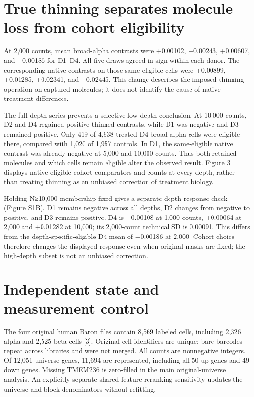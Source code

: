 \documentclass[11pt,letterpaper]{article}
\begin{document}
\section*{True thinning separates molecule loss from cohort eligibility}
At 2,000 counts, mean broad-alpha contrasts were +0.00102, −0.00243, +0.00607, and −0.00186 for D1–D4. All five draws agreed in sign within each donor. The corresponding native contrasts on those same eligible cells were +0.00899, +0.01285, +0.02341, and +0.02445. This change describes the imposed thinning operation on captured molecules; it does not identify the cause of native treatment differences.

The full depth series prevents a selective low-depth conclusion. At 10,000 counts, D2 and D4 regained positive thinned contrasts, while D1 was negative and D3 remained positive. Only 419 of 4,938 treated D4 broad-alpha cells were eligible there, compared with 1,020 of 1,957 controls. In D1, the same-eligible native contrast was already negative at 5,000 and 10,000 counts. Thus both retained molecules and which cells remain eligible alter the observed result. Figure 3 displays native eligible-cohort comparators and counts at every depth, rather than treating thinning as an unbiased correction of treatment biology.

Holding N≥10,000 membership fixed gives a separate depth-response check (Figure S1B). D1 remains negative across all depths, D2 changes from negative to positive, and D3 remains positive. D4 is −0.00108 at 1,000 counts, +0.00064 at 2,000 and +0.01282 at 10,000; its 2,000-count technical SD is 0.00091. This differs from the depth-specific-eligible D4 mean of −0.00186 at 2,000. Cohort choice therefore changes the displayed response even when original masks are fixed; the high-depth subset is not an unbiased correction.

\section*{Independent state and measurement control}
The four original human Baron files contain 8,569 labeled cells, including 2,326 alpha and 2,525 beta cells [3]. Original cell identifiers are unique; bare barcodes repeat across libraries and were not merged. All counts are nonnegative integers. Of 12,051 universe genes, 11,694 are represented, including all 50 up genes and 49 down genes. Missing TMEM236 is zero-filled in the main original-universe analysis. An explicitly separate shared-feature reranking sensitivity updates the universe and block denominators without refitting.
\end{document}
